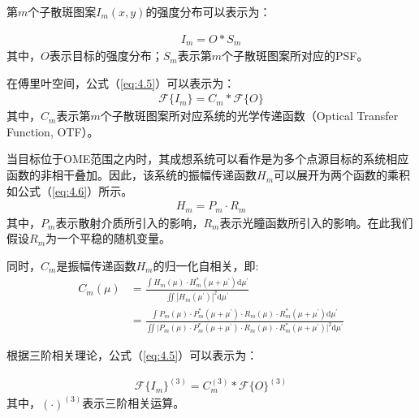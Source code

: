 第$m$个子散斑图案$I_m(x,y)$的强度分布可以表示为\cite{goodman_speckle_2007,goodman_introduction_2005}：

\begin{equation}
\begin{aligned}
    I_m = O*S_m
\end{aligned}
\label{eq:4.4}
\end{equation}其中，$O$表示目标的强度分布；$S_m$表示第$m$个子散斑图案所对应的PSF。

在傅里叶空间，公式（\ref{eq:4.5}）可以表示为\cite{goodman_speckle_2007,goodman_introduction_2005}：
\begin{equation}
\begin{aligned}
    \mathcal{F} \{ I_m \} = C_m*\mathcal{F}\{ O \}
\end{aligned}
\label{eq:4.5}
\end{equation}其中，$C_m$表示第$m$个子散斑图案所对应系统的光学传递函数（Optical Transfer Function, OTF）。

当目标位于OME范围之内时，其成想系统可以看作是为多个点源目标的系统相应函数的非相干叠加\cite{goodman_speckle_2007,goodman_introduction_2005}。因此，该系统的振幅传递函数$H_m$可以展开为两个函数的乘积如公式（\ref{eq:4.6}）所示。
\begin{equation}
\begin{aligned}
    H_m = P_m \cdot R_m
\end{aligned}
\label{eq:4.6}
\end{equation}其中，$P_m$表示散射介质所引入的影响，$R_m$表示光瞳函数所引入的影响。在此我们假设$R_m$为一个平稳的随机变量。

同时，$C_m$是振幅传递函数$H_m$的归一化自相关，即:
\begin{equation}
\begin{aligned}
    C_m(\mu) &= \frac{\int{H_m(\mu) \cdot H_m^{*}(\mu + \mu^{\prime})}\mathrm{d}{\mu^{\prime}}}{\iint{|H_m(\mu^{\prime})|^2}\mathrm{d}{\mu^{\prime}}}\\
    &=\frac{\int{P_m(\mu) \cdot P_m^{*}(\mu + \mu^{\prime})} \cdot {R_m(\mu) \cdot R_m^{*}(\mu + \mu^{\prime})} \mathrm{d}{\mu^{\prime}}}{\iint{|P_m(\mu) \cdot P_m^{*}(\mu + \mu^{\prime})} \cdot {R_m(\mu) \cdot R_m^{*}(\mu + \mu^{\prime})}|^2 \mathrm{d}{\mu^{\prime}}}
\end{aligned}
\label{eq:4.7}
\end{equation}

根据三阶相关理论\cite{lohmann_speckle_1983,northcott_algorithms_1988}，公式（\ref{eq:4.5}）可以表示为：

\begin{equation}
\begin{aligned}
    \mathcal{F} \{ I_m \}^{(3)} = C_m^{(3)}*\mathcal{F}\{ O \}^{(3)}
\end{aligned}
\label{eq:4.8}
\end{equation}其中，$( \cdot ) ^{(3)}$表示三阶相关运算。

